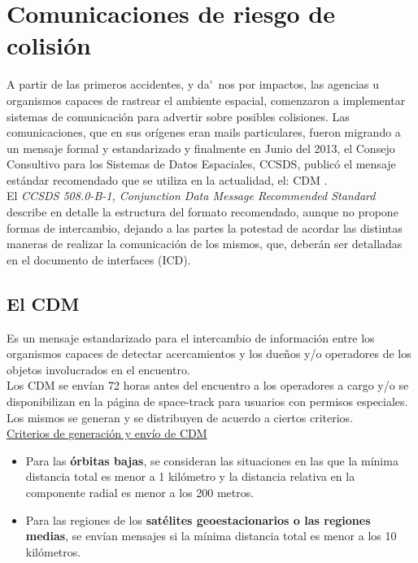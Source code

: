 {\section{Comunicaciones de riesgo de colisi\'on}{\label{sec:anuncio}}


A partir de las primeros accidentes, y da\'~nos por impactos, las agencias u organismos capaces de rastrear el ambiente espacial, comenzaron a implementar sistemas de comunicaci\'on para advertir sobre posibles colisiones. Las comunicaciones, que en sus or\'igenes eran mails particulares, fueron migrando a un mensaje formal y estandarizado y finalmente en Junio del 2013, el Consejo Consultivo para los Sistemas de Datos Espaciales, \ac{CCSDS}, public\'o el mensaje est\'andar recomendado que se utiliza en la actualidad, el: \ac{CDM} \citep{CDM}.\\
El {\it{CCSDS 508.0-B-1, Conjunction Data Message Recommended Standard}} describe en detalle la estructura del formato recomendado, aunque no propone formas de intercambio, dejando a las partes la potestad de acordar las distintas maneras de realizar la comunicaci\'on de los mismos, que, deber\'an ser detalladas en el documento de interfaces (ICD).\\

\subsection{El CDM}\label{subsec:cdm}

Es un mensaje estandarizado para el intercambio de informaci\'on entre los organismos capaces de detectar acercamientos y los due\~nos y/o operadores de los objetos involucrados en el encuentro.\\
Los CDM se env\'ian 72 horas antes del encuentro a los operadores a cargo y/o se disponibilizan en la p\'agina de space-track para usuarios con permisos especiales.\\
Los mismos se generan y se distribuyen de acuerdo a ciertos criterios.\\


\underline{Criterios de generaci\'on y env\'io de CDM}
\begin{itemize}
\item Para las {\bf{\'orbitas bajas}}, se consideran las situaciones en las que la m\'inima distancia total es menor a 1 kil\'ometro y la distancia relativa en la componente radial es menor a los 200 metros.\\

\item Para las regiones de los {\bf{sat\'elites geoestacionarios o las regiones medias}}, se env\'ian mensajes si la m\'inima distancia total es menor a los 10 kil\'ometros.\\
\end{itemize}


}
